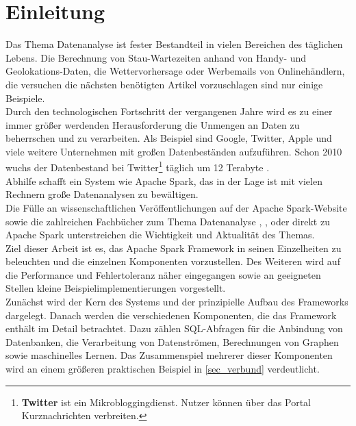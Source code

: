 \newpage
\chapter{Einleitung} 

Das Thema Datenanalyse ist fester Bestandteil in vielen Bereichen des täglichen Lebens. Die Berechnung von Stau-Wartezeiten anhand von Handy- und Geolokations-Daten, die Wettervorhersage oder Werbemails von Onlinehändlern, die versuchen die nächsten benötigten Artikel vorzuschlagen sind nur einige Beispiele.\\

\noindent
Durch den technologischen Fortschritt der vergangenen Jahre wird es zu einer immer größer werdenden Herausforderung die Unmengen an Daten zu beherrschen und zu verarbeiten. Als Beispiel sind Google, Twitter, Apple und viele weitere Unternehmen mit großen Datenbeständen aufzuführen. Schon 2010 wuchs der Datenbestand bei Twitter\footnote{\textbf{Twitter} ist ein Mikrobloggingdienst. Nutzer können über das Portal Kurznachrichten verbreiten. } täglich um 12 Terabyte \cite{TWITTER_12}. \\

\noindent
Abhilfe schafft ein System wie Apache Spark, das in der Lage ist mit vielen Rechnern große Datenanalysen zu bewältigen. \\

\noindent
Die Fülle an wissenschaftlichen Veröffentlichungen \cite{SPRESEARCH} auf der Apache Spark-Website sowie die zahlreichen Fachbücher zum Thema Datenanalyse \cite{DA15}, \cite{AAWS15}, \cite{BDS16} oder direkt zu Apache Spark unterstreichen die Wichtigkeit und Aktualität des Themas.\\

\noindent
Ziel dieser Arbeit ist es, das Apache Spark Framework in seinen Einzelheiten zu beleuchten und die einzelnen Komponenten vorzustellen. Des Weiteren wird auf die Performance und Fehlertoleranz näher eingegangen sowie an geeigneten Stellen kleine Beispielimplementierungen vorgestellt. \\

\noindent
Zunächst wird der Kern des Systems und der prinzipielle Aufbau des Frameworks dargelegt. Danach werden die verschiedenen Komponenten, die das Framework enthält im Detail betrachtet. Dazu zählen SQL-Abfragen für die Anbindung von Datenbanken, die Verarbeitung von Datenströmen, Berechnungen von Graphen sowie maschinelles Lernen. Das Zusammenspiel mehrerer dieser Komponenten wird an einem größeren praktischen Beispiel in \autoref{sec_verbund} verdeutlicht. \\

